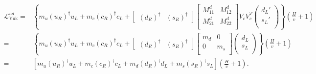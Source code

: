 \begin{align}
  \mathcal{L}_{\text{Yuk}}^{ud}
=&\left\{ m_u\left( u_R \right)^{\dagger} u_L+m_c \left( c_R \right)^{\dagger}c_L
+\begin{bmatrix}
     \left( d_R \right)^{\dagger} &  \left( s_R \right)^{\dagger}
   \end{bmatrix}
   \begin{bmatrix}
     M^{d}_{11} & M^{d}_{12} \\
     M^{d}_{21} & M^{d}_{22} \\                                      
  \end{bmatrix} V_c V_c^T
  \begin{pmatrix}
    d_L'\\
    s_L'\\
  \end{pmatrix}
     \right\}
   \left( \frac{H}{v} +1\right) \nonumber\\
=&\left\{ m_u\left( u_R \right)^{\dagger} u_L+m_c \left( c_R \right)^{\dagger}c_L
+\begin{bmatrix}
     \left( d_R \right)^{\dagger} &  \left( s_R \right)^{\dagger}
   \end{bmatrix}
   \begin{bmatrix}
     m_d & 0 \\
     0 & m_s \\                                      
  \end{bmatrix} 
  \begin{pmatrix}
    d_L\\
    s_L\\
  \end{pmatrix}
     \right\}
   \left( \frac{H}{v} +1\right) \nonumber\\
=&\left[ m_u\left( u_R \right)^{\dagger} u_L+m_c \left( c_R \right)^{\dagger}c_L
+m_d\left( d_R \right)^{\dagger}d_L+ m_s \left( s_R \right)^{\dagger}s_L 
     \right]
   \left( \frac{H}{v} +1\right).
\end{align}

